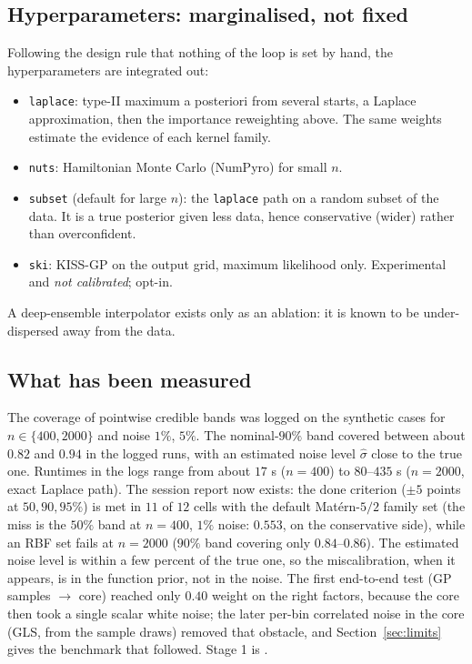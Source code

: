 \subsection{Hyperparameters: marginalised, not fixed}
Following the design rule that nothing of the loop is set by hand, the hyperparameters are integrated out:
\begin{itemize}[nosep]
\item \texttt{laplace}: type-II maximum a posteriori from several starts, a Laplace approximation, then the importance reweighting above. The same weights estimate the evidence of each kernel family.
\item \texttt{nuts}: Hamiltonian Monte Carlo (NumPyro) for small $n$.
\item \texttt{subset} (default for large $n$): the \texttt{laplace} path on a random subset of the data. It is a true posterior given less data, hence conservative (wider) rather than overconfident.
\item \texttt{ski}: KISS-GP on the output grid, maximum likelihood only. Experimental and \emph{not calibrated}; opt-in.
\end{itemize}
A deep-ensemble interpolator exists only as an ablation: it is known to be under-dispersed away from the data.

\subsection{What has been measured}
The coverage of pointwise credible bands was logged on the synthetic cases for $n\in\{400,2000\}$ and noise $1\%$, $5\%$. The nominal-$90\%$ band covered between about $0.82$ and $0.94$ in the logged runs, with an estimated noise level $\hat\sigma$ close to the true one. Runtimes in the logs range from about $17$ s ($n=400$) to $80$--$435$ s ($n=2000$, exact Laplace path). The session report now exists: the done criterion ($\pm5$ points at $50,90,95\%$) is met in $11$ of $12$ cells with the default Mat\'ern-$5/2$ family set (the miss is the $50\%$ band at $n=400$, $1\%$ noise: $0.553$, on the conservative side), while an RBF set fails at $n=2000$ ($90\%$ band covering only $0.84$--$0.86$). The estimated noise level is within a few percent of the true one, so the miscalibration, when it appears, is in the function prior, not in the noise. The first end-to-end test (GP samples $\to$ core) reached only $0.40$ weight on the right factors, because the core then took a single scalar white noise; the later per-bin correlated noise in the core (GLS, from the sample draws) removed that obstacle, and Section~\ref{sec:limits} gives the benchmark that followed. Stage 1 is \impl{}.

